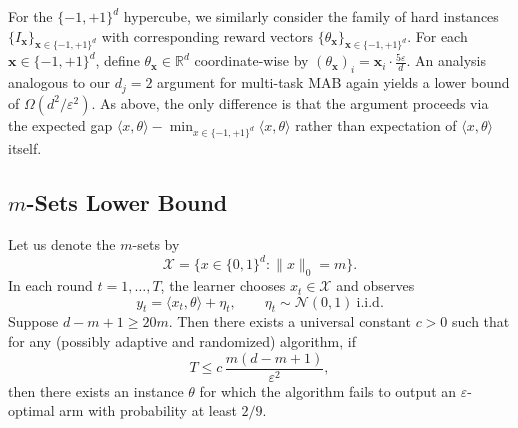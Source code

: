 For the $\{-1,+1\}^d$ hypercube, we similarly consider the family of hard instances $\{I_{\mathbf{x}}\}_{\mathbf{x}\in\{-1,+1\}^d}$ with corresponding reward vectors $\{\theta_{\mathbf{x}}\}_{\mathbf{x}\in\{-1,+1\}^d}$. For each $\mathbf{x}\in\{-1,+1\}^d$, define $\theta_{\mathbf{x}}\in\mathbb{R}^d$ coordinate-wise by
$(\theta_{\mathbf{x}})_i=\mathbf{x}_i\cdot \frac{5\varepsilon}{d}$.
An analysis analogous to our $d_j=2$ argument for multi-task MAB again yields a lower bound of $\Omega(d^2/\varepsilon^2)$. As above, the only difference is that the argument proceeds via the expected gap $\langle x,\theta\rangle-\min_{x\in\{-1,+1\}^d}\langle x,\theta\rangle$ rather than expectation of $\langle x,\theta\rangle$ itself.




\subsection{$m$-Sets Lower Bound}\label{appendix-m-sets-lower-bound}
\begin{theorem}\label{appendix:thm-m-sets}
Let us denote the $m$-sets by
\[
\mathcal X=\{x\in\{0,1\}^d:\|x\|_0=m\}.
\]
In each round $t=1,\dots,T$, the learner chooses $x_t\in\mathcal X$ and observes
\[
y_t=\langle x_t,\theta\rangle+\eta_t,\qquad \eta_t\sim \mathcal N(0,1)\ \text{i.i.d.}
\]
Suppose $d-m+1\ge 20m$. Then there exists a universal constant $c>0$ such that for any (possibly adaptive and randomized) algorithm,
if
\[
T \le c\,\frac{m(d-m+1)}{\varepsilon^2},
\]
then there exists an instance $\theta$ for which the algorithm fails to output an $\varepsilon$-optimal arm with probability
at least $2/9$.
\end{theorem}

